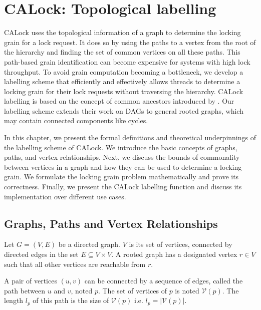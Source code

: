 

\chapter{CALock: Topological labelling} \label{chap:theory}
\minitoc
CALock uses the topological information of a graph to determine the locking grain for a lock request. It does so by using the paths to a vertex from the root of the hierarchy and finding the set of common vertices on all these paths. This path-based grain identification can become expensive for systems with high lock throughput. To avoid grain computation becoming a bottleneck, we develop a labelling scheme that efficiently and effectively allows threads to determine a locking grain for their lock requests without traversing the hierarchy. CALock labelling is based on the concept of common ancestors introduced by \citet{fischer2010new}. Our labelling scheme extends their work on DAGs to general rooted graphs, which may contain connected components like cycles. 

In this chapter, we present the formal definitions and theoretical underpinnings of the labelling scheme of CALock.
We introduce the basic concepts of graphs, paths, and vertex relationships.
Next, we discuss the bounds of commonality between vertices in a graph and how they can be used to determine a locking grain. We formulate the locking grain problem mathematically and prove its correctness. Finally, we present the CALock labelling function and discuss its implementation over different use cases.

\section{Graphs, Paths and Vertex Relationships}


Let $G=(V, E)$ be a directed graph. $V$ is its set of vertices, connected by directed edges in the set $E \subseteq V \times V$.  A rooted graph has a designated vertex $r \in V$ such that all other vertices are reachable from $r$.

A pair of vertices $(u, v)$ can be connected by a sequence of edges, called the path between $u$ and $v$, noted $p$. The set of vertices of $p$ is noted $\mathcal{V}(p)$. The length $l_p$ of this path is the size of $\mathcal{V}(p)$ i.e. $l_p = \lvert \mathcal{V}(p)\rvert$.


